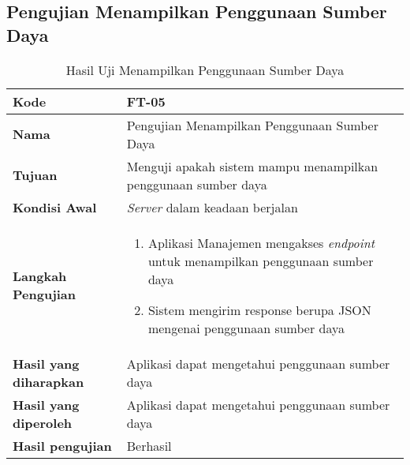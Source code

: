 \subsection{Pengujian Menampilkan Penggunaan Sumber Daya}
\begin{longtable}{|p{3cm}|p{6.5cm}|}
	\caption{Hasil Uji Menampilkan Penggunaan Sumber Daya} \label{t:uji_menampilkan_penggunaan_sumber_daya} \\ \hline
	\textbf{Kode} & FT-05 \\ \hline
	\textbf{Nama} & Pengujian Menampilkan Penggunaan Sumber Daya \\ \hline
	\textbf{Tujuan} & Menguji apakah sistem mampu menampilkan penggunaan sumber daya \\ \hline
	\textbf{Kondisi Awal} &  \textit{Server} dalam keadaan berjalan\\ \hline
	\textbf{Langkah Pengujian} &  
	\begin{enumerate}
		\item Aplikasi Manajemen mengakses \textit{endpoint} untuk menampilkan penggunaan sumber daya
		\item Sistem mengirim response berupa JSON mengenai penggunaan sumber daya
	\end{enumerate} \\ \hline
	\textbf{Hasil yang diharapkan} & Aplikasi dapat mengetahui penggunaan sumber daya \\ \hline
	\textbf{Hasil yang diperoleh} & Aplikasi dapat mengetahui penggunaan sumber daya \\ \hline
	\textbf{Hasil pengujian} & Berhasil \\ \hline
\end{longtable}
